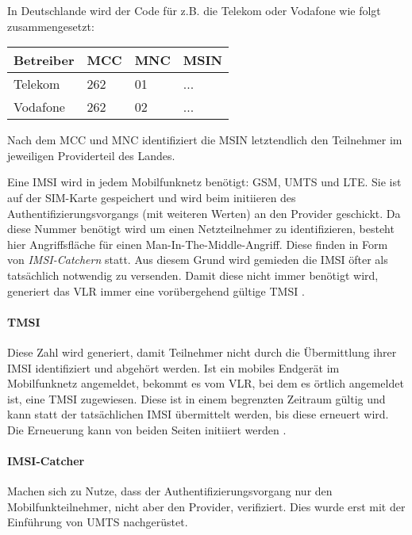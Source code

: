In Deutschlande wird der Code für z.B. die Telekom oder Vodafone wie folgt zusammengesetzt:\vspace*{5mm}

    \begin{tabularx}{\textwidth}{|l||l|l|X|}
    \hline
      \textbf{Betreiber} & \textbf{MCC} & \textbf{MNC} & \textbf{MSIN} \\
    \hline
    \hline
      Telekom & 262 & 01 & ... \\
    \hline
    \hline
      Vodafone & 262 & 02 & ...\\
    \hline
    \end{tabularx}
    \vspace*{5mm}

Nach dem \ac{MCC} und \ac{MNC} identifiziert die \ac{MSIN} letztendlich
den Teilnehmer im jeweiligen Providerteil des Landes.

Eine \ac{IMSI} wird in jedem Mobilfunknetz benötigt: \ac{GSM}, \ac{UMTS}
und \ac{LTE}. Sie ist auf der SIM-Karte gespeichert und wird beim
initiieren des Authentifizierungsvorgangs (mit weiteren Werten) an
den Provider geschickt. Da diese Nummer benötigt wird um einen Netzteilnehmer
zu identifizieren, besteht hier Angriffsfläche für einen Man-In-The-Middle-Angriff. Diese finden in Form von \textit{IMSI-Catchern} statt.
Aus diesem Grund wird gemieden die IMSI öfter als tatsächlich notwendig
zu versenden. Damit diese nicht immer benötigt wird, generiert das
\ac{VLR} immer eine vorübergehend gültige \ac{TMSI} \cite{3gpp.33.003}.

\paragraph{TMSI} Diese Zahl wird generiert, damit Teilnehmer nicht
durch die Übermittlung ihrer \ac{IMSI} identifiziert und abgehört werden.
Ist ein mobiles Endgerät im Mobilfunknetz angemeldet, bekommt es vom
\ac{VLR}, bei dem es örtlich angemeldet ist, eine \ac{TMSI} zugewiesen.
Diese ist in einem begrenzten Zeitraum gültig und kann statt der
tatsächlichen \ac{IMSI} übermittelt werden, bis diese erneuert wird.
Die Erneuerung kann von beiden Seiten initiiert werden \cite{3gpp.33.003}.

\label{par:imsicatcher}
\paragraph{IMSI-Catcher} Machen sich zu Nutze, dass der
Authentifizierungsvorgang nur den Mobilfunkteilnehmer, nicht aber den 
Provider, verifiziert. Dies wurde erst mit der Einführung von \ac{UMTS}
nachgerüstet.

